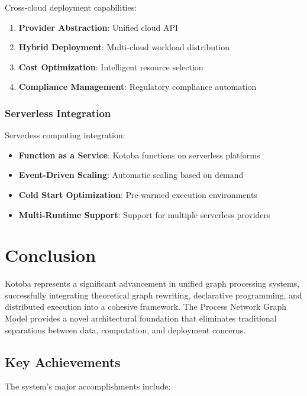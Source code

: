 \documentclass[11pt,a4paper]{article}
\begin{document}
Cross-cloud deployment capabilities:

\begin{enumerate}
\item \textbf{Provider Abstraction}: Unified cloud API
\item \textbf{Hybrid Deployment}: Multi-cloud workload distribution
\item \textbf{Cost Optimization}: Intelligent resource selection
\item \textbf{Compliance Management}: Regulatory compliance automation
\end{enumerate}

\subsubsection{Serverless Integration}
\label{subsubsec:serverless}

Serverless computing integration:

\begin{itemize}
\item \textbf{Function as a Service}: Kotoba functions on serverless platforms
\item \textbf{Event-Driven Scaling}: Automatic scaling based on demand
\item \textbf{Cold Start Optimization}: Pre-warmed execution environments
\item \textbf{Multi-Runtime Support}: Support for multiple serverless providers
\end{itemize}

\section{Conclusion}
\label{sec:conclusion}

Kotoba represents a significant advancement in unified graph processing systems, successfully integrating theoretical graph rewriting, declarative programming, and distributed execution into a cohesive framework. The Process Network Graph Model provides a novel architectural foundation that eliminates traditional separations between data, computation, and deployment concerns.

\subsection{Key Achievements}
\label{subsec:achievements}

The system's major accomplishments include:
\end{document}
